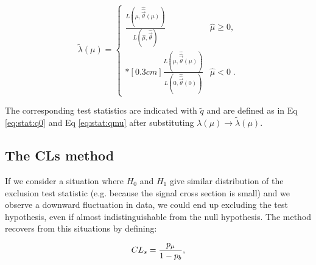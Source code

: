 \begin{equation}
\label{eq:stat:lik:alpexcl}
\tilde{\lambda}({\mu}) =
\left\{ \! \! \begin{array}{ll}
               \frac{ L(\mu,
               \hat{\hat{\vec{\theta}}}(\mu)) }
               {L(\hat{\mu}, \hat{\vec{\theta}}) }
                 & \hat{\mu} \ge 0 , \\*[0.3 cm]
                \frac{ L(\mu,
               \hat{\hat{\vec{\theta}}}(\mu)) }
               {L(0, \hat{\hat{\vec{\theta}}}(0)) }
 & \hat{\mu} < 0 \;.
              \end{array}
       \right.
\end{equation}

\noindent The corresponding test statistics are indicated with $\tilde{q}$ and are defined as in Eq \ref{eq:stat:q0} and Eq \ref{eq:stat:qmu} after substituting $\lambda({\mu}) \rightarrow \tilde{\lambda}({\mu})$.

\subsection{The CLs method}

If we consider a situation where $H_0$ and $H_1$ give similar distribution of the exclusion test statistic (e.g. because the signal cross section is
small) and we observe a downward fluctuation in data, we could end up excluding the test hypothesis, even if almost indistinguishable from the null hypothesis. The \cls method \cite{JUNK1999435} recovers from this situations by defining:

\begin{equation}
\label{eq:stat:cls}
CL_s = \dfrac{p_\mu}{1 - p_b} , 
\end{equation}

